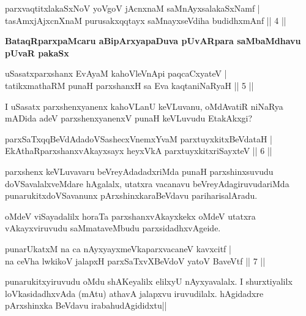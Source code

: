 \begin{shl}
parxvaqtitxlakaSxNoV yoVgoV jAcnxnaM saMnAyxsalakaSxNamf |\\
tasAmxjAjxcnXnaM purusakxqqtayx saMnayxseVdiha budidhxmAnf \hfill || 4 ||
\end{shl}

\begin{artha}%
\textbf{BataqRparxpaMcaru aBipArxyapaDuva pUvARpara saMbaMdhavu pUvaR pakaSx}
\end{artha}

\begin{shl}
uSasatxparxshanx EvAyaM kahoVleVnApi paqcaCxyateV |\\
tatikxmathaRM punaH parxshanxH sa Eva kaqtaniNaRyaH \hfill || 5 ||
\end{shl}

\begin{artha}
I uSasatx parxshenxyanenx kahoVLanU keVLuvanu, oMdAvatiR niNaRya mADida adeV parxshenxyanenxV punaH keVLuvudu EtakAkxgi?
\end{artha}

\begin{shl}
parxSaTxqqBeVdAdadoVSashecxVnemxYvaM parxtuyxkitxBeVdataH |\\
EkAthaRparxshanxvAkayxsayx heyxVkA parxtuyxkitxriSayxteV \hfill || 6 ||
\end{shl}

\begin{artha}
parxshenx keVLuvavaru beVreyAdadadxriMda punaH parxshinxsuvudu doVSavalalxveMdare hAgalalx, utatxra vacanavu beVreyAdagiruvudariMda punarukitxdoVSavanunx pArxshinxkaraBeVdavu pariharisalAradu.

oMdeV viSayadalilx horaTa parxshanxvAkayxkekx oMdeV utatxra vAkayxviruvudu saMmataveMbudu parxsidadhxvAgeide. 
\end{artha}

\begin{shl}
punarUkatxM na ca nAyxyayxmeVkaparxvacaneV kavxcitf |\\
na ceVha lwkikoV jalapxH parxSaTxvXBeVdoV yatoV BaveVtf \hfill || 7 ||
\end{shl}

\begin{artha}
punarukitxyiruvudu oMdu shAKeyalilx elilxyU nAyxyavalalx. I shurxtiyalilx loVkasidadhxvAda (mAtu) athavA jalapxvu iruvudilalx. hAgidadxre pArxshinxka BeVdavu irabahudAgididxtu||
\end{artha}


